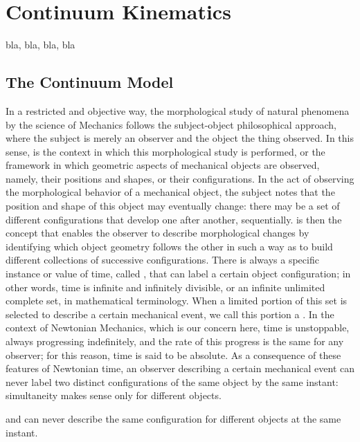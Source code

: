 \chapter{Continuum Kinematics}

bla, bla, bla, bla


\section{The Continuum Model}


In a restricted and objective way, the morphological study of natural phenomena by the science of Mechanics follows the subject-object philosophical approach, where the subject is merely an observer and the object the thing observed. In this sense,  is the context in which this morphological study is performed, or the framework in which geometric aspects of mechanical objects are observed, namely, their positions and shapes, or their configurations. In the act of observing the morphological behavior of a mechanical object, the subject notes that the position and shape of this object may eventually change: there may be a set of different configurations that develop one after another, sequentially.  is then the concept that enables the observer to describe morphological changes by identifying which object geometry follows the other in such a way as to build different collections of successive configurations. There is always a specific instance or value of time, called , that can label a certain object configuration; in other words, time is infinite and infinitely divisible, or an infinite unlimited complete set, in mathematical terminology. When a limited portion of this set is selected to describe a certain mechanical event, we call this portion a . In the context of Newtonian Mechanics, which is our concern here, time is unstoppable, always progressing indefinitely, and the rate of this progress is the same for any observer; for this reason, time is said to be absolute. As a consequence of these features of Newtonian time, an observer describing a certain mechanical event can never label two distinct configurations of the same object by the same instant: simultaneity makes sense only for different objects. 






and can never describe the same configuration for different objects at the same instant.   


